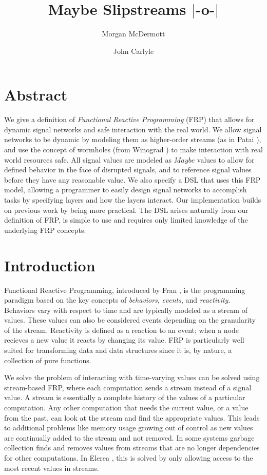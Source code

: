 \documentclass[twocolumn]{paper}
\title{Maybe Slipstreams $|$-o-$|$}
\author[*]{Morgan McDermott}
\author[**]{John Carlyle}
\affil[*]{University of flightless dragons}
\affil[**]{University of angry bees}
\begin{document}
\maketitle

\section{Abstract}
We give a definition of \textit{Functional Reactive Programming} (FRP) that allows for dynamic signal networks and safe interaction with the real world. We allow signal networks to be dynamic by modeling them as higher-order streams (as in Patai \cite{HighOrderStreams}), and use the concept of wormholes (from Winograd \cite{WinogradCort2012HS}) to make interaction with real world resources safe. All signal values are modeled as $Maybe$ values to allow for defined behavior in the face of disrupted signals, and to reference signal values before they have any reasonable value. We also specify a DSL that uses this FRP model, allowing a programmer to easily design signal networks to accomplish tasks by specifying layers and how the layers interact. Our implementation builds on previous work by being more practical. The DSL arises naturally from our definition of FRP, is simple to use and requires only limited knowledge of the underlying FRP concepts.

\section{Introduction}
Functional Reactive Programming, introduced by Fran \cite{ElliottHudak97:Fran}, is the programming paradigm based on the key concepts of \textit{behaviors}, \textit{events}, and \textit{reactivity}. Behaviors vary with respect to time and are typically modeled as a stream of values. These values can also be considered events depending on the granularity of the stream. Reactivity is defined as a reaction to an event; when a node recieves a new value it reacts by changing its value. FRP is particularly well suited for transforming data and data structures since it is, by nature, a collection of pure functions. 

We solve the problem of interacting with time-varying values can be solved using stream-based FRP, where each computation sends a stream instead of a signal value. A stream is essentially a complete history of the values of a particular computation. Any other computation that needs the current value, or a value from the past, can look at the stream and find the appropriate values. This leads to additional problems like memory usage growing out of control as new values are continually added to the stream and not removed. In some systems garbage collection finds and removes values from streams that are no longer dependencies for other computations. In Elerea \cite{HighOrderStreams}, this is solved by only allowing access to the most recent values in streams. 
\end{document}
